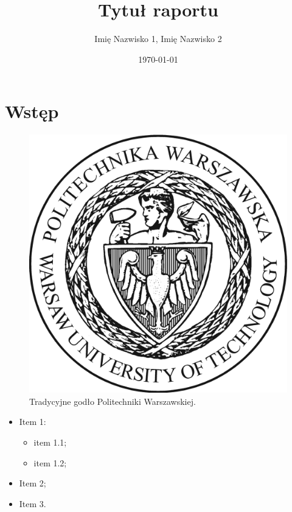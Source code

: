 \documentclass[
    showauthor=true,  %
    showsubject=true, %
    showdate=true,    %
    hyphenation=true  %
]{src/wut-report}
\begin{document}

\author{Imię Nazwisko 1, Imię Nazwisko 2}
\subject{Nazwa przedmiotu}
\title{Tytuł raportu}
\date{\today}
\maketitle

\leftheader{\theauthor}
\rightheader{\thesubject}


\section{Wstęp} \label{sec:intro}
\lipsum[1]

\begin{figure}[!h]
	\centering \includegraphics[width=0.4\linewidth]{img/logopw.png}
	\caption{Tradycyjne godło Politechniki Warszawskiej.}
	\label{fig:logo}
\end{figure}

\lipsum[2]

\begin{itemize}
    \item Item 1:
    \begin{itemize}[label=---]
        \item item 1.1;
        \item item 1.2;
    \end{itemize}
    \item Item 2;
    \item Item 3.
\end{itemize}
\end{document}
